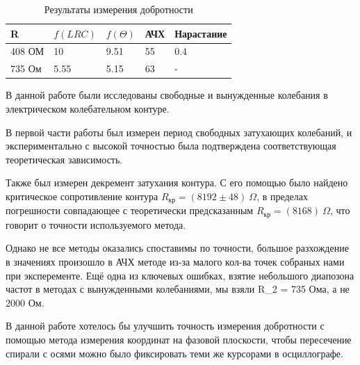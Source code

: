 \documentclass[a4paper,12pt]{article}
\begin{document}
\begin{enumerate}
\begin{table}[h!]
	\centering
	\begin{tabular}{|l|l|l|l|l|}
		\hline
		R      &$f(LRC)$ & $f(\Theta)$         & АЧХ      & Нарастание      \\ \hline
		408 ОМ & 10      & 9.51                & 55      & 0.4   \\ \hline
		735 Ом & 5.55    & 5.15                & 63      & -   \\ \hline
	\end{tabular}
	\caption{Результаты измерения добротности}
	\label{1}
\end{table}

В данной работе были исследованы свободные и вынужденные колебания в электрическом колебательном контуре.

В первой части работы был измерен период свободных затухающих колебаний, и экспериментально с высокой точностью была подтверждена соответствующая теоретическая зависимость.

Также был измерен декремент затухания контура. С его помощью было найдено критическое сопротивление контура $R_{\text{кр}}=\left(8192\pm48\right)~\Omega$, в пределах погрешности совпадающее с теоретически предсказанным $R_{\text{кр}}=\left(8168\right)~\Omega$, что говорит о точности используемого метода.

Однако не все методы оказались споставимы по точности, большое разхождение в значениях произошло в АЧХ методе из-за малого кол-ва точек собраных нами при эксперементе. Ещё одна из ключевых ошибках, взятие небольшого диапозона частот в методах с вынужденными колебаниями, мы взяли {R_2} = 735 Ома, а не 2000 Ом.

В данной работе хотелось бы улучшить точность измерения добротности с помощью метода измерения координат на фазовой плоскости, чтобы пересечение спирали с осями можно было фиксировать теми же курсорами в осциллографе. 
\end{enumerate}
\end{document}

